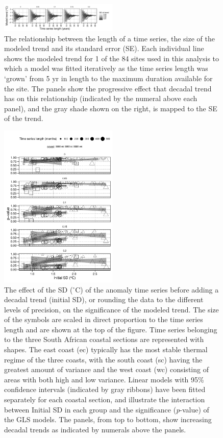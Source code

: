 \documentclass[twocol]{ametsoc}
\begin{document}
\begin{figure}
\centering \includegraphics[width=0.50\textwidth]{figure04}
\caption{The relationship between the length of a time series, the size of the modeled trend and its standard error (SE). Each individual line shows the modeled trend for 1 of the 84 sites used in this analysis to which a model was fitted iteratively as the time series length was `grown' from 5 yr in length to the maximum duration available for the site. The panels show the progressive effect that decadal trend has on this relationship (indicated by the numeral above each panel), and the gray shade shown on the right, is mapped to the SE of the trend.}
\label{figure04}
\end{figure}

\begin{figure}
\centering \includegraphics[width=0.50\textwidth]{figure05}
\caption{The effect of the SD ($^{\circ}$C) of the anomaly time series before adding a decadal trend (initial SD), or rounding the data to the different levels of precision, on the significance of the modeled trend. The size of the symbols are scaled in direct proportion to the time series length and are shown at the top of the figure. Time series belonging to the three South African coastal sections are represented with shapes. The east coast (ec) typically has the most stable thermal regime of the three coasts, with the south coast (sc) having the greatest amount of variance and the west coast (wc) consisting of areas with both high and low variance. Linear models with 95\% confidence intervals (indicated by gray ribbons) have been fitted separately for each coastal section, and illustrate the interaction between Initial SD in each group and the significance (\emph{p}-value) of the GLS models. The panels, from top to bottom, show increasing decadal trends as indicated by numerals above the panels.}
\label{figure05}
\end{figure}
\end{document}
